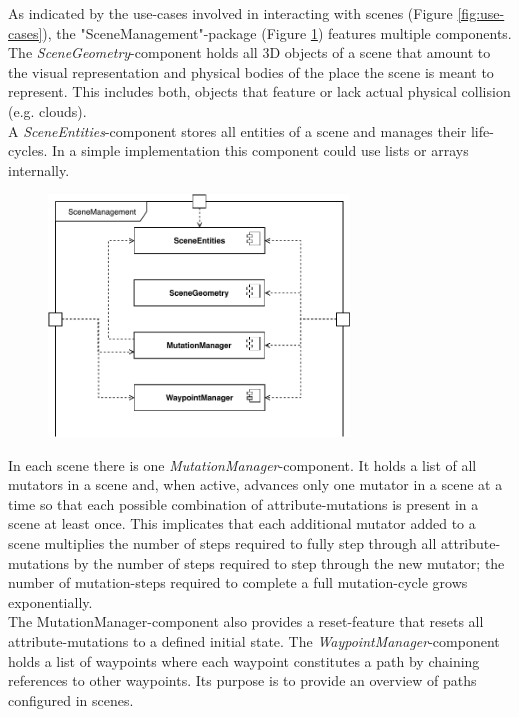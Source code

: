 As indicated by the use-cases involved in interacting with scenes (Figure \ref{fig:use-cases}), the "SceneManagement"-package (Figure \ref{fig:component-diagram-scenemanagement}) features multiple components.\\
The \emph{SceneGeometry}-component holds all 3D objects of a scene that amount to the visual representation and physical bodies of the place the scene is meant to represent. This includes both, objects that feature or lack actual physical collision (e.g. clouds).\\
A \emph{SceneEntities}-component stores all entities of a scene and manages their life-cycles. In a simple implementation this component could use lists or arrays internally.
\begin{figure}[hb!]
    \centering
    \includegraphics[width=8cm]{img/ch04/ComponentDiagram_SceneManagement.pdf}
    \label{fig:component-diagram-scenemanagement}
\end{figure}
In each scene there is one \emph{MutationManager}-component. It holds a list of all mutators in a scene and, when active, advances only one mutator in a scene at a time so that each possible combination of attribute-mutations is present in a scene at least once. This implicates that each additional mutator added to a scene multiplies the number of steps required to fully step through all attribute-mutations by the number of steps required to step through the new mutator; the number of mutation-steps required to complete a full mutation-cycle grows exponentially.\\
The MutationManager-component also provides a reset-feature that resets all attribute-mutations to a defined initial state.
The \emph{WaypointManager}-component holds a list of waypoints where each waypoint constitutes a path by chaining references to other waypoints. Its purpose is to provide an overview of paths configured in scenes.
%
